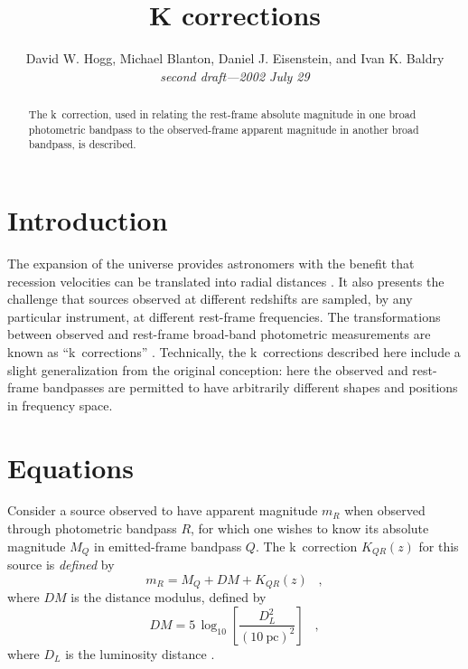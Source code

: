 \documentclass[preprint]{aastex}
\begin{document}
\title{K corrections}
\author{
  David W. Hogg,
  Michael Blanton,
  Daniel J. Eisenstein,
  and Ivan K. Baldry\\
  \textsl{second draft---2002 July 29}
}

\begin{abstract}
The k~correction, used in relating the rest-frame absolute magnitude
in one broad photometric bandpass to the observed-frame apparent
magnitude in another broad bandpass, is described.
\end{abstract}

\section{Introduction}

The expansion of the universe provides astronomers with the benefit
that recession velocities can be translated into radial distances
\citep[eg,][and references therein]{hogg99cosm}.  It also presents the
challenge that sources observed at different redshifts are sampled, by
any particular instrument, at different rest-frame frequencies.  The
transformations between observed and rest-frame broad-band photometric
measurements are known as ``k~corrections'' \citep{oke68a}.
Technically, the k~corrections described here include a slight
generalization from the original conception: here the observed and
rest-frame bandpasses are permitted to have arbitrarily different
shapes and positions in frequency space.

\section{Equations}

Consider a source observed to have apparent magnitude $m_R$ when
observed through photometric bandpass $R$, for which one wishes to
know its absolute magnitude $M_Q$ in emitted-frame bandpass $Q$.  The
k~correction $K_{QR}(z)$ for this source is \emph{defined} by
\begin{equation}
\label{eq:definition}
m_R = M_Q + DM + K_{QR}(z) \;\;\;,
\end{equation}
where $DM$ is the distance modulus, defined by
\begin{equation}
DM = 5\,\log_{10}\left[\frac{D_L^2}{(10~\mathrm{pc})^2}\right] \;\;\;,
\end{equation}
where $D_L$ is the luminosity distance \citep[eg,][]{hogg99cosm}.
\end{document}
